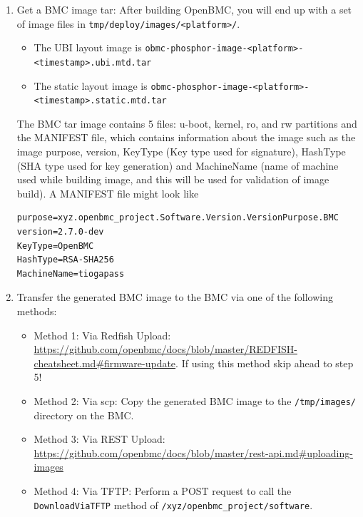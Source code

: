 \begin{enumerate}
\def\labelenumi{\arabic{enumi}.}
\item
  Get a BMC image tar: After building OpenBMC, you will end up with a
  set of image files in
  \texttt{tmp/deploy/images/\textless{}platform\textgreater{}/}.

  \begin{itemize}
  \tightlist
  \item
    The UBI layout image is
    \texttt{obmc-phosphor-image-\textless{}platform\textgreater{}-\textless{}timestamp\textgreater{}.ubi.mtd.tar}
  \item
    The static layout image is
    \texttt{obmc-phosphor-image-\textless{}platform\textgreater{}-\textless{}timestamp\textgreater{}.static.mtd.tar}
  \end{itemize}

  The BMC tar image contains 5 files: u-boot, kernel, ro, and rw
  partitions and the MANIFEST file, which contains information about the
  image such as the image purpose, version, KeyType (Key type used for
  signature), HashType (SHA type used for key generation) and
  MachineName (name of machine used while building image, and this will
  be used for validation of image build). A MANIFEST file might look
  like

\begin{verbatim}
purpose=xyz.openbmc_project.Software.Version.VersionPurpose.BMC
version=2.7.0-dev
KeyType=OpenBMC
HashType=RSA-SHA256
MachineName=tiogapass
\end{verbatim}
\item
  Transfer the generated BMC image to the BMC via one of the following
  methods:

  \begin{itemize}
  \tightlist
  \item
    Method 1: Via Redfish Upload:
    \url{https://github.com/openbmc/docs/blob/master/REDFISH-cheatsheet.md\#firmware-update}.
    If using this method skip ahead to step 5!
  \item
    Method 2: Via scp: Copy the generated BMC image to the
    \texttt{/tmp/images/} directory on the BMC.
  \item
    Method 3: Via REST Upload:
    \url{https://github.com/openbmc/docs/blob/master/rest-api.md\#uploading-images}
  \item
    Method 4: Via TFTP: Perform a POST request to call the
    \texttt{DownloadViaTFTP} method of
    \texttt{/xyz/openbmc\_project/software}.
  \end{itemize}


\end{enumerate}
